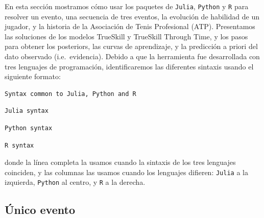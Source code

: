 \documentclass[a4paper,11pt]{book}
\theoremstyle{definition}
\begin{document}
En esta secci\'on mostramos c\'omo usar los paquetes de \texttt{Julia}, \texttt{Python} y \texttt{R} para resolver un evento, una secuencia de tres eventos, la evoluci\'on de habilidad de un jugador, y la historia de la Asociaci\'on de Tenis Profesional (ATP).
%
Presentamos las soluciones de los modelos TrueSkill y TrueSkill Through Time, y los pasos para obtener los posteriors, las curvas de aprendizaje, y la predicci\'on a priori del dato observado (i.e.~evidencia).
%
Debido a que la herramienta fue desarrollada con tres lenguajes de programaci\'on, identificaremos las diferentes sintaxis usando el siguiente formato:
%
\begin{lstlisting}[captionpos=b, backgroundcolor=\color{all}, belowskip=-0.77 \baselineskip,escapechar=|]
Syntax common to Julia, Python and R
\end{lstlisting}
\begin{paracol}{3}
\begin{lstlisting}[backgroundcolor=\color{julia!60}]
Julia syntax
\end{lstlisting}
  \switchcolumn
\begin{lstlisting}[backgroundcolor=\color{python!60}]
Python syntax
\end{lstlisting}
   \switchcolumn
\begin{lstlisting}[backgroundcolor=\color{r!50}]
R syntax
\end{lstlisting}
\end{paracol}
%
donde la l\'inea completa la usamos cuando la sintaxis de los tres lenguajes coinciden, y las columnas las usamos cuando los lenguajes difieren: \texttt{Julia} a la izquierda, \texttt{Python} al centro, y \texttt{R} a la derecha.

\subsection{\'Unico evento} \label{sec:singleEvent}
\end{document}

